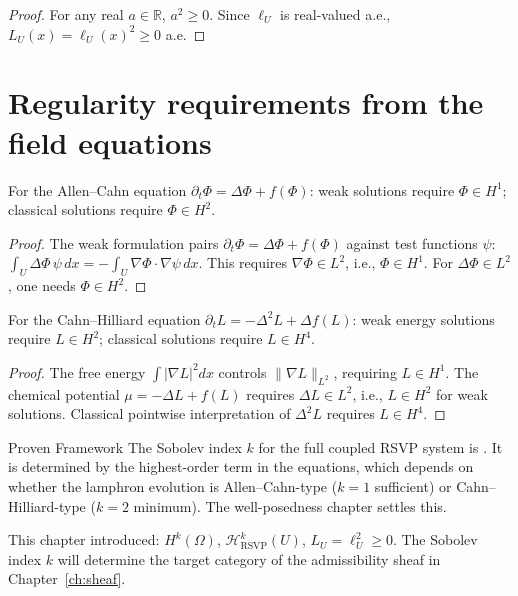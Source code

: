 \begin{proof}
  For any real $a \in \mathbb{R}$, $a^2 \geq 0$.
  Since $\ell_U$ is real-valued a.e., $L_U(x) = \ell_U(x)^2 \geq 0$ a.e.
\end{proof}

\section{Regularity requirements from the field equations}

\begin{proposition}
  \label{prop:ac-regularity}
  \statusproven{}
  For the Allen--Cahn equation $\partial_t\Phi = \Delta\Phi + f(\Phi)$:
  weak solutions require $\Phi \in H^1$;
  classical solutions require $\Phi \in H^2$.
\end{proposition}

\begin{proof}
  The weak formulation pairs $\partial_t\Phi = \Delta\Phi + f(\Phi)$
  against test functions $\psi$:
  $\int_U \Delta\Phi\,\psi\,dx = -\int_U \nabla\Phi\cdot\nabla\psi\,dx$.
  This requires $\nabla\Phi \in L^2$, i.e., $\Phi \in H^1$.
  For $\Delta\Phi \in L^2$, one needs $\Phi \in H^2$.
\end{proof}

\begin{proposition}
  \label{prop:ch-regularity}
  \statusproven{}
  For the Cahn--Hilliard equation $\partial_t L = -\Delta^2 L + \Delta f(L)$:
  weak energy solutions require $L \in H^2$;
  classical solutions require $L \in H^4$.
\end{proposition}

\begin{proof}
  The free energy $\int|\nabla L|^2 dx$ controls $\|\nabla L\|_{L^2}$,
  requiring $L \in H^1$.
  The chemical potential $\mu = -\Delta L + f(L)$ requires $\Delta L \in L^2$,
  i.e., $L \in H^2$ for weak solutions.
  Classical pointwise interpretation of $\Delta^2 L$ requires $L \in H^4$.
\end{proof}

\begin{StatusBox}{Proven Framework}
  The Sobolev index $k$ for the full coupled RSVP system is
  \statusopen{}.
  It is determined by the highest-order term in the equations,
  which depends on whether the lamphron evolution is
  Allen--Cahn-type ($k=1$ sufficient) or Cahn--Hilliard-type
  ($k=2$ minimum).
  The well-posedness chapter settles this.
\end{StatusBox}

\begin{MathEcho}
  This chapter introduced:
  $H^k(\Omega)$, $\mathcal{H}^k_{\mathrm{RSVP}}(U)$,
  $L_U = \ell_U^2 \geq 0$.
  The Sobolev index $k$ will determine the target category
  of the admissibility sheaf in Chapter~\ref{ch:sheaf}.
\end{MathEcho}
